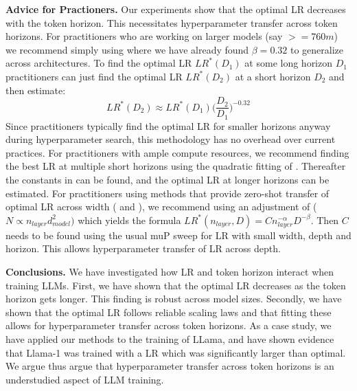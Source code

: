 \textbf{Advice for Practioners.} Our experiments show that the optimal LR decreases with the token horizon. This necessitates hyperparameter transfer across token horizons. For practitioners who are working on larger models (say $>= 760m$) we recommend simply using  where we have already found $\beta =0.32$ to generalize across architectures. To find the optimal LR $LR^*(D_1)$ at some long horizon $D_1$ practitioners can just find the optimal LR $LR^*(D_2)$ at a short horizon $D_2$ and then estimate:
\begin{equation}
LR^*(D_2) \approx LR^*(D_1) \bigg( \frac{D_2}{D_1} \bigg)^{-0.32}
\end{equation}
Since practitioners typically find the optimal LR for smaller horizons anyway during hyperparameter search, this methodology has no overhead over current practices. For practitioners with ample compute resources, we recommend finding the best LR at multiple short horizons using the quadratic fitting of . Thereafter the constants in  can be found, and the optimal LR at longer horizons can be estimated. For practitioners using methods that provide zero-shot transfer of optimal LR across width (\cite{mup} and \cite{everett2024scaling}), we recommend using an adjustment of  ($N\propto {n_{layer}}{d^2_{model}})$ which yields the formula $LR^*(n_{layer},D) = C {n^{-\alpha}_{layer}} D^{-\beta}$. Then $C$ needs to be found using the usual muP sweep for LR with small width, depth and horizon. This allows hyperparameter transfer of LR across depth.

\textbf{Conclusions.} We have investigated how LR and token horizon interact when training LLMs. First, we have shown that the optimal LR decreases as the token horizon gets longer. This finding is robust across model sizes. Secondly, we have shown that the optimal LR follows reliable scaling laws and that fitting these allows for hyperparameter transfer across token horizons. As a case study, we have applied our methods to the training of LLama, and have shown evidence that Llama-1 was trained with a LR which was significantly larger than optimal. We argue thus argue that hyperparameter transfer across token horizons is an understudied aspect of LLM training. 



